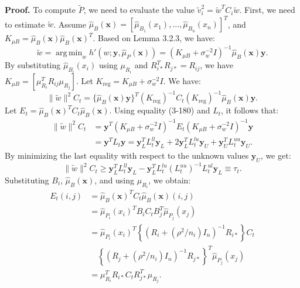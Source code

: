 \documentclass[12pt]{article}
\DeclareMathOperator*{\argmin}{arg\,min}
\begin{document}
	\textbf{Proof.} To compute $\tilde{P}$, we need to evaluate the value $\tilde{v}_i^2 = \tilde{w}^T C_i \tilde{w}$. First, we need to estimate $\tilde{w}$. Assume $\hat{\mu}_B(\mathbf{x}) = [\hat{\mu}_{B_1}(x_1), \ldots, \hat{\mu}_{B_n}(x_n)]^T$, and $K_{\mu B} = \hat{\mu}_B(\mathbf{x}) \hat{\mu}_B(\mathbf{x})^T$. Based on Lemma 3.2.3, we have:
	\begin{equation}
		\tilde{w} = \argmin_w h'(w; \mathbf{y}, \hat{\mu}_P(\mathbf{x})) = (K_{\mu B} + \sigma_w^{-2} I)^{-1} \hat{\mu}_B(\mathbf{x}) \mathbf{y}.
	\end{equation}
	By substituting $\hat{\mu}_{B_i}(x_i)$ using $\mu_{R_i}$ and $R_{i*}^T R_{j*} = R_{ij}$, we have $K_{\mu B} = [\mu_{R_i}^T R_{ij} \mu_{R_j}]$. Let $K_{\text{reg}} = K_{\mu B} + \sigma_w^{-2} I$. We have:
	\begin{equation}
		\|\tilde{w}\|^2 C_t = \{ \hat{\mu}_B(\mathbf{x}) \mathbf{y} \}^T (K_{\text{reg}})^{-1} C_t (K_{\text{reg}})^{-1} \hat{\mu}_B(\mathbf{x}) \mathbf{y}.
	\end{equation}
	Let $E_t = \hat{\mu}_B(\mathbf{x})^T C_t \hat{\mu}_B(\mathbf{x})$. Using equality (3-180) and $L_t$, it follows that:
	\begin{align}
		\|\tilde{w}\|^2 C_t &= \mathbf{y}^T (K_{\mu B} + \sigma_w^{-2} I)^{-1} E_t (K_{\mu B} + \sigma_w^{-2} I)^{-1} \mathbf{y} \\
		&= \mathbf{y}^T L_t \mathbf{y} = \mathbf{y}_L^T L_t^{ll} \mathbf{y}_L + 2 \mathbf{y}_L^T L_t^{lu} \mathbf{y}_U + \mathbf{y}_U^T L_t^{uu} \mathbf{y}_U.
	\end{align}
	By minimizing the last equality with respect to the unknown values $\mathbf{y}_U$, we get:
	\begin{equation}
		\|\tilde{w}\|^2 C_t \ge \mathbf{y}_L^T L_t^{ll} \mathbf{y}_L - \mathbf{y}_L^T L_t^{lu} (L_t^{uu})^{-1} L_t^{ul} \mathbf{y}_L \equiv \tau_t.
	\end{equation}
	Substituting $B_i$, $\hat{\mu}_B(\mathbf{x})$, and using $\mu_{R_i}$, we obtain:
	\begin{align}
		E_t(i, j) &= \hat{\mu}_B(\mathbf{x})^T C_t \hat{\mu}_B(\mathbf{x})(i, j) \\
		&= \hat{\mu}_{P_i}(x_i)^T B_i C_t B_j^T \hat{\mu}_{P_j}(x_j) \\
		&= \hat{\mu}_{P_i}(x_i)^T \left\{ (R_i + (\rho^2 / n_i) I_n)^{-1} R_{i*} \right\} C_t \\
		&\quad \left\{ (R_j + (\rho^2 / n_i) I_n)^{-1} R_{j*} \right\}^T \hat{\mu}_{P_j}(x_j) \\
		&= \mu_{R_i}^T R_{i*} C_t R_{j*}^T \mu_{R_j}.
	\end{align}
\end{document}
